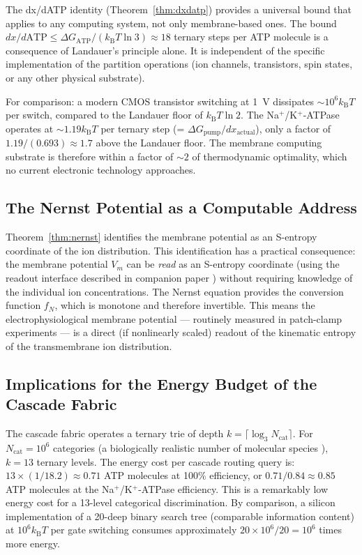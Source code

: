 \documentclass[11pt,twocolumn,a4paper]{article}
\theoremstyle{definition}
\theoremstyle{remark}
\newcommand{\kB}{k_{\mathrm{B}}}
\begin{document}
The dx/dATP identity (Theorem~\ref{thm:dxdatp}) provides a universal bound that
applies to any computing system, not only membrane-based ones. The bound
$dx/d\mathrm{ATP} \leq \Delta G_{\mathrm{ATP}} / (\kB T \ln 3) \approx 18$
ternary steps per ATP molecule is a consequence of Landauer's principle alone.
It is independent of the specific implementation of the partition operations
(ion channels, transistors, spin states, or any other physical substrate).

For comparison: a modern CMOS transistor switching at 1~V dissipates
$\sim 10^6 \kB T$ per switch, compared to the Landauer floor of $\kB T \ln 2$.
The Na$^+$/K$^+$-ATPase operates at $\sim 1.19 \kB T$ per ternary step
(= $\Delta G_{\mathrm{pump}} / dx_{\mathrm{actual}}$), only a factor of
$1.19 / (0.693) \approx 1.7$ above the Landauer floor. The membrane computing
substrate is therefore within a factor of $\sim 2$ of thermodynamic optimality,
which no current electronic technology approaches.

\subsection{The Nernst Potential as a Computable Address}

Theorem~\ref{thm:nernst} identifies the membrane potential as an S-entropy
coordinate of the ion distribution. This identification has a practical consequence:
the membrane potential $V_m$ can be \emph{read} as an S-entropy coordinate
(using the readout interface described in companion paper \citep{companion6})
without requiring knowledge of the individual ion concentrations. The Nernst
equation provides the conversion function $f_N$, which is monotone and therefore
invertible. This means the electrophysiological membrane potential --- routinely
measured in patch-clamp experiments --- is a direct (if nonlinearly scaled) readout
of the kinematic entropy of the transmembrane ion distribution.

\subsection{Implications for the Energy Budget of the Cascade Fabric}

The cascade fabric \citep{companion5} operates a ternary trie of depth
$k = \lceil \log_3 N_{\mathrm{cat}} \rceil$. For $N_{\mathrm{cat}} = 10^6$
categories (a biologically realistic number of molecular species \citep{picard2019}),
$k = 13$ ternary levels. The energy cost per cascade routing query is:
$13 \times (1/18.2) \approx 0.71$ ATP molecules at 100\% efficiency,
or $0.71 / 0.84 \approx 0.85$ ATP molecules at the Na$^+$/K$^+$-ATPase efficiency.
This is a remarkably low energy cost for a 13-level categorical discrimination.
By comparison, a silicon implementation of a 20-deep binary search tree
(comparable information content) at $10^6 \kB T$ per gate switching consumes
approximately $20 \times 10^6 / 20 = 10^6$ times more energy.
\end{document}
